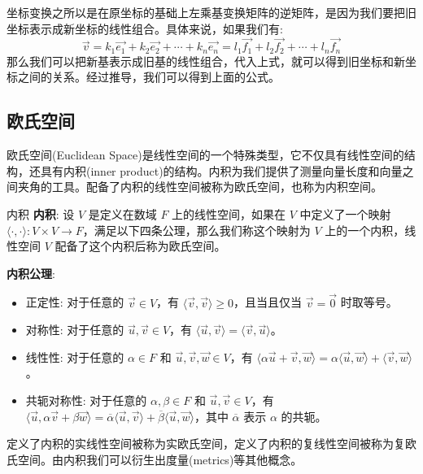 \documentclass[a4paper,12pt]{ctexart}
\begin{document}
    坐标变换之所以是在原坐标的基础上左乘基变换矩阵的逆矩阵，是因为我们要把旧坐标表示成新坐标的线性组合。具体来说，如果我们有:
    \[
    \vec{v} = k_1 \vec{e_1} + k_2 \vec{e_2} + \cdots + k_n \vec{e_n} = l_1 \vec{f_1} + l_2 \vec{f_2} + \cdots + l_n \vec{f_n}
    \]
    那么我们可以把新基表示成旧基的线性组合，代入上式，就可以得到旧坐标和新坐标之间的关系。经过推导，我们可以得到上面的公式。

\subsection{欧氏空间}

欧氏空间(Euclidean Space)是线性空间的一个特殊类型，它不仅具有线性空间的结构，还具有内积(inner product)的结构。内积为我们提供了测量向量长度和向量之间夹角的工具。配备了内积的线性空间被称为欧氏空间，也称为内积空间。

    \begin{mydef}{内积}{}
    \textbf{内积}: 设 $V$ 是定义在数域 $F$ 上的线性空间，如果在 $V$ 中定义了一个映射 $\langle \cdot , \cdot \rangle: V \times V \to F$，满足以下四条公理，那么我们称这个映射为 $V$ 上的一个内积，线性空间 $V$ 配备了这个内积后称为欧氏空间。
    
    \textbf{内积公理}:
    \begin{itemize}
        \item 正定性: 对于任意的 $\vec{v} \in V$，有 $\langle \vec{v}, \vec{v} \rangle \geq 0$，且当且仅当 $\vec{v} = \vec{0}$ 时取等号。
        \item 对称性: 对于任意的 $\vec{u}, \vec{v} \in V$，有 $\langle \vec{u}, \vec{v} \rangle = \langle \vec{v}, \vec{u} \rangle$。
        \item 线性性: 对于任意的 $\alpha \in F$ 和 $\vec{u}, \vec{v}, \vec{w} \in V$，有 $\langle \alpha \vec{u} + \vec{v}, \vec{w} \rangle = \alpha \langle \vec{u}, \vec{w} \rangle + \langle \vec{v}, \vec{w} \rangle$。
        \item 共轭对称性: 对于任意的 $\alpha, \beta \in F$ 和 $\vec{u}, \vec{v} \in V$，有 $\langle \vec{u}, \alpha \vec{v} + \beta \vec{w} \rangle = \overline{\alpha} \langle \vec{u}, \vec{v} \rangle + \overline{\beta} \langle \vec{u}, \vec{w} \rangle$，其中 $\overline{\alpha}$ 表示 $\alpha$ 的共轭。
    \end{itemize}
    \end{mydef}
    
    定义了内积的实线性空间被称为实欧氏空间，定义了内积的复线性空间被称为复欧氏空间。由内积我们可以衍生出度量(metrics)等其他概念。
\end{document}
